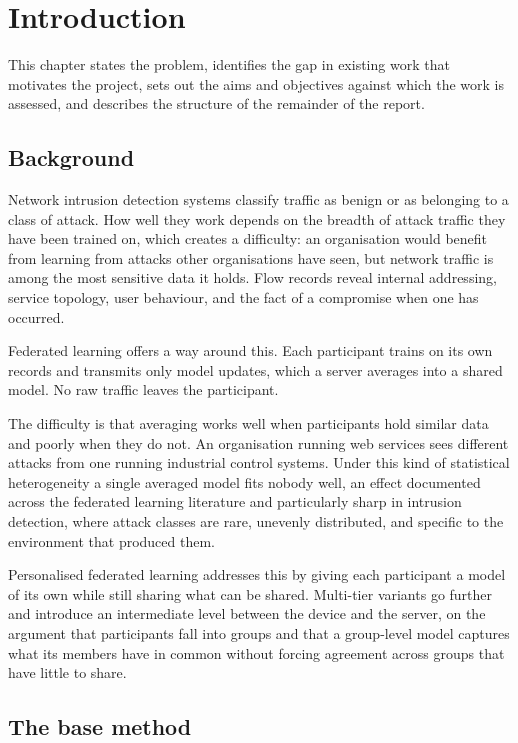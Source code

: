 \chapter{Introduction}
\label{chap:intro}

This chapter states the problem, identifies the gap in existing work that
motivates the project, sets out the aims and objectives against which the work
is assessed, and describes the structure of the remainder of the report.

\section{Background}
\label{sec:background}

Network intrusion detection systems classify traffic as benign or as belonging
to a class of attack. How well they work depends on the breadth of attack
traffic they have been trained on, which creates a difficulty: an organisation
would benefit from learning from attacks other organisations have seen, but
network traffic is among the most sensitive data it holds. Flow records reveal
internal addressing, service topology, user behaviour, and the fact of a
compromise when one has occurred.

Federated learning \parencite{mcmahan-2017} offers a way around this. Each
participant trains on its own records and transmits only model updates, which a
server averages into a shared model. No raw traffic leaves the participant.

The difficulty is that averaging works well when participants hold similar
data and poorly when they do not. An organisation running web services sees
different attacks from one running industrial control systems. Under this kind
of statistical heterogeneity a single averaged model fits nobody well, an
effect documented across the federated learning literature and particularly
sharp in intrusion detection, where attack classes are rare, unevenly
distributed, and specific to the environment that produced them.

Personalised federated learning addresses this by giving each participant a
model of its own while still sharing what can be shared. Multi-tier variants go
further and introduce an intermediate level between the device and the server,
on the argument that participants fall into groups and that a group-level model
captures what its members have in common without forcing agreement across
groups that have little to share.

\section{The base method}
\label{sec:base-method}

